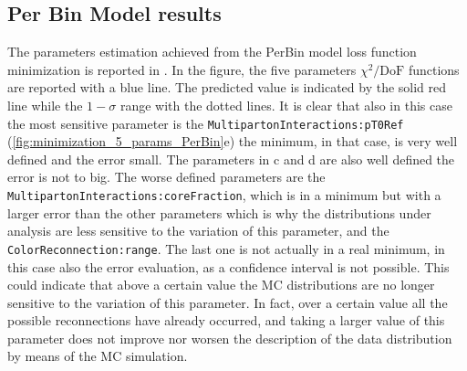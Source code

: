 \subsection{Per Bin Model results}

The parameters estimation achieved from the PerBin model loss function minimization is reported in . In the figure, the five parameters $\chi^2/\mathrm{DoF}$ functions are reported with a blue line. The predicted value is indicated by the solid red line while the $1-\sigma$ range with the dotted lines. 
It is clear that also in this case the most sensitive parameter is the \texttt{MultipartonInteractions:pT0Ref} (\ref{fig:minimization_5_params_PerBin}e) the minimum, in that case, is very well defined and the error small. The parameters in c and d are also well defined the error is not to big. The worse defined parameters are  the \texttt{MultipartonInteractions:coreFraction}, which is in a minimum but with a larger error than the other parameters which is why the distributions under analysis are less sensitive to the variation of this parameter, and the \texttt{ColorReconnection:range}. The last one is not actually in a real minimum, in this case also the error evaluation, as a confidence interval is not possible. This could indicate that above a certain value the MC distributions are no longer  sensitive to the variation of this parameter. In fact, over a certain value all the possible reconnections have already occurred, and taking a larger value of this parameter does not improve nor worsen the description of the data distribution by means of the MC simulation.
  
